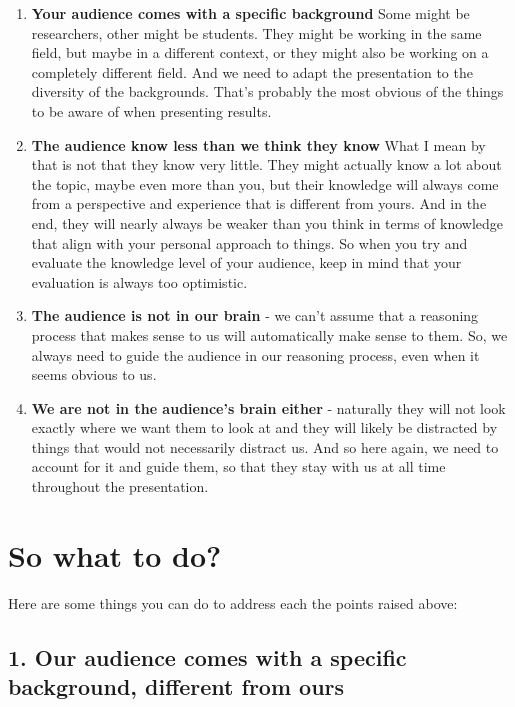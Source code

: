 \documentclass[
]{book}
\begin{document}
\begin{enumerate}
\def\labelenumi{\arabic{enumi}.}
\item
  \textbf{Your audience comes with a specific background} Some might be researchers, other might be students. They might be working in the same field, but maybe in a different context, or they might also be working on a completely different field. And we need to adapt the presentation to the diversity of the backgrounds. That's probably the most obvious of the things to be aware of when presenting results.
\item
  \textbf{The audience know less than we think they know} What I mean by that is not that they know very little. They might actually know a lot about the topic, maybe even more than you, but their knowledge will always come from a perspective and experience that is different from yours. And in the end, they will nearly always be weaker than you think in terms of knowledge that align with your personal approach to things. So when you try and evaluate the knowledge level of your audience, keep in mind that your evaluation is always too optimistic.
\item
  \textbf{The audience is not in our brain} - we can't assume that a reasoning process that makes sense to us will automatically make sense to them. So, we always need to guide the audience in our reasoning process, even when it seems obvious to us.
\item
  \textbf{We are not in the audience's brain either} - naturally they will not look exactly where we want them to look at and they will likely be distracted by things that would not necessarily distract us. And so here again, we need to account for it and guide them, so that they stay with us at all time throughout the presentation.
\end{enumerate}

\hypertarget{so-what-to-do}{%
\section{So what to do?}\label{so-what-to-do}}

Here are some things you can do to address each the points raised above:

\hypertarget{our-audience-comes-with-a-specific-background-different-from-ours}{%
\subsection{1. Our audience comes with a specific background, different from ours}\label{our-audience-comes-with-a-specific-background-different-from-ours}}
\end{document}
